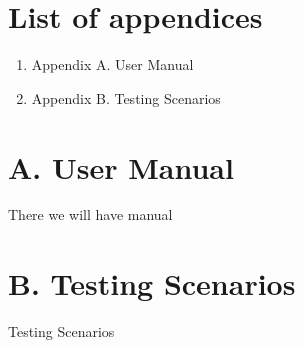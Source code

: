 \documentclass[a4paper,11pt,twoside]{report}
\theoremstyle{definition}
\begin{document}
\chapter*{List of appendices}
\begin{enumerate}
\item Appendix A. User Manual
\item Appendix B. Testing Scenarios
\end{enumerate}
\thispagestyle{empty}


\chapter*{A. User Manual}

There we will have manual
\thispagestyle{empty}

\chapter*{B. Testing Scenarios}

Testing Scenarios
\thispagestyle{empty}
\end{document}

